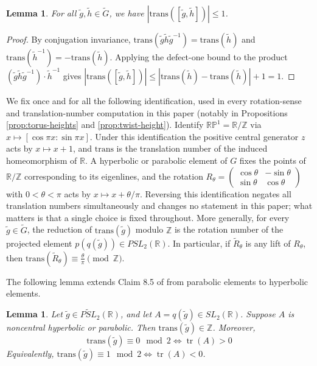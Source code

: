 \documentclass{article}
\DeclareMathOperator{\tr}{tr}
\theoremstyle{plain}
\theoremstyle{definition}
\theoremstyle{plain}
\theoremstyle{plain}
\theoremstyle{plain}
\newtheorem{lemma}[theorem]{Lemma}
\theoremstyle{remark}
\theoremstyle{remark}
\theoremstyle{plain}
\theoremstyle{plain}
\theoremstyle{plain}
\theoremstyle{plain}
\begin{document}
\begin{lemma}\label{lma:commutator}
For all $\widetilde{g}, \widetilde{h} \in \widetilde{G}$, we have $|\mathrm{trans}([\widetilde{g}, \widetilde{h}])| \leq 1$.
\end{lemma}

\begin{proof}
By conjugation invariance, $\mathrm{trans}(\widetilde{g}\widetilde{h}\widetilde{g}^{-1}) = \mathrm{trans}(\widetilde{h})$ and $\mathrm{trans}(\widetilde{h}^{-1}) = -\mathrm{trans}(\widetilde{h})$. Applying the defect-one bound to the product $(\widetilde{g}\widetilde{h}\widetilde{g}^{-1})\cdot\widetilde{h}^{-1}$ gives $|\mathrm{trans}([\widetilde{g},\widetilde{h}])| \leq |\mathrm{trans}(\widetilde{h}) - \mathrm{trans}(\widetilde{h})| + 1 = 1$.
\end{proof}

We fix once and for all the following identification, used in every rotation-sense and translation-number computation in this paper (notably in Propositions \ref{prop:torus-heights} and \ref{prop:twist-height}). Identify $\mathbb{RP}^1 = \mathbb{R}/\mathbb{Z}$ via $x \mapsto [\cos \pi x : \sin \pi x]$. Under this identification the positive central generator $z$ acts by $x \mapsto x + 1$, and $\mathrm{trans}$ is the translation number of the induced homeomorphism of $\mathbb{R}$. A hyperbolic or parabolic element of $G$ fixes the points of $\mathbb R / \mathbb Z$ corresponding to its eigenlines, and the rotation $R_\theta = \left(\begin{smallmatrix}\cos\theta & -\sin\theta\\ \sin\theta & \cos\theta\end{smallmatrix}\right)$ with $0 < \theta < \pi$ acts by $x \mapsto x + \theta/\pi$. Reversing this identification negates all translation numbers simultaneously and changes no statement in this paper; what matters is that a single choice is fixed throughout. More generally, for every $\widetilde g \in \widetilde G$, the reduction of $\mathrm{trans}(\widetilde g)$ modulo $\mathbb Z$ is the rotation number of the projected element $p(q(\widetilde g)) \in PSL_2(\mathbb{R})$. In particular, if $\widetilde R_\theta$ is any lift of $R_\theta$, then $\mathrm{trans}(\widetilde R_\theta) \equiv \frac{\theta}{\pi} \pmod{\mathbb Z}$. 

\medskip

The following lemma extends Claim 8.5 of \cite{cullerdunfield} from parabolic elements to hyperbolic elements. 

\begin{lemma}\label{lma:parity}
Let $\widetilde{g} \in \widetilde{PSL}_2(\mathbb{R})$, and let $A = q(\widetilde{g}) \in SL_2(\mathbb{R})$. Suppose $A$ is noncentral hyperbolic or parabolic. Then $\mathrm{trans}(\widetilde{g}) \in \mathbb{Z}$. Moreover, 
\begin{equation*}
	\mathrm{trans}(\widetilde{g}) \equiv 0 \mod 2 \iff \tr(A) > 0
\end{equation*}
Equivalently, $\mathrm{trans}(\widetilde{g}) \equiv 1 \mod 2 \iff \tr(A) < 0$.
\end{lemma}
\end{document}
